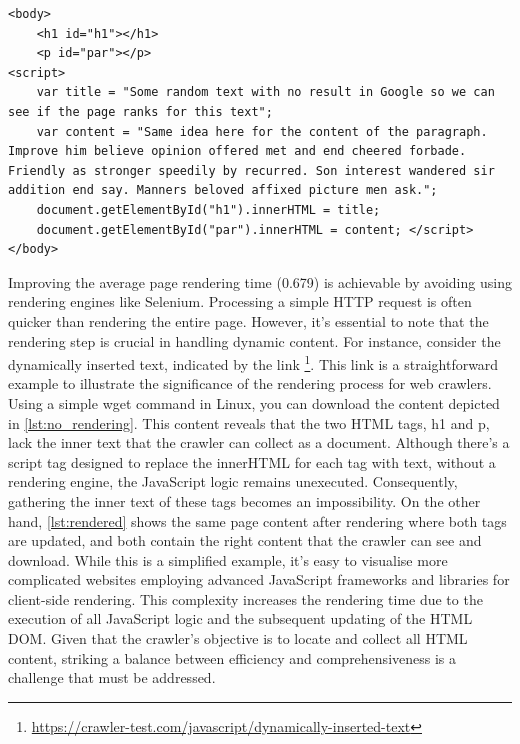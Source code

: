 {\begin{lstlisting}[caption={The dynamically-inserted-text link content before rendering},captionpos=b, label={lst:no_rendering}]
<body>
	<h1 id="h1"></h1> 
	<p id="par"></p>
<script>
	var title = "Some random text with no result in Google so we can see if the page ranks for this text";
	var content = "Same idea here for the content of the paragraph. Improve him believe opinion offered met and end cheered forbade. Friendly as stronger speedily by recurred. Son interest wandered sir addition end say. Manners beloved affixed picture men ask."; 
	document.getElementById("h1").innerHTML = title; 
	document.getElementById("par").innerHTML = content; </script>
</body>
\end{lstlisting}

Improving the average page rendering time (0.679) is achievable by avoiding using rendering engines like Selenium. Processing a simple HTTP request is often quicker than rendering the entire page. However, it's essential to note that the rendering step is crucial in handling dynamic content. For instance, consider the dynamically inserted text, indicated by the link \footnote{\url{https://crawler-test.com/javascript/dynamically-inserted-text}}. This link is a straightforward example to illustrate the significance of the rendering process for web crawlers.
Using a simple wget command in Linux, you can download the content depicted in \ref{lst:no_rendering}. This content reveals that the two HTML tags, h1 and p, lack the inner text that the crawler can collect as a document. Although there's a script tag designed to replace the innerHTML for each tag with text, without a rendering engine, the JavaScript logic remains unexecuted. Consequently, gathering the inner text of these tags becomes an impossibility. On the other hand, \ref{lst:rendered} shows the same page content after rendering where both tags are updated, and both contain the right content that the crawler can see and download.
While this is a simplified example, it's easy to visualise more complicated websites employing advanced JavaScript frameworks and libraries for client-side rendering. This complexity increases the rendering time due to the execution of all JavaScript logic and the subsequent updating of the HTML DOM. Given that the crawler's objective is to locate and collect all HTML content, striking a balance between efficiency and comprehensiveness is a challenge that must be addressed.


}
